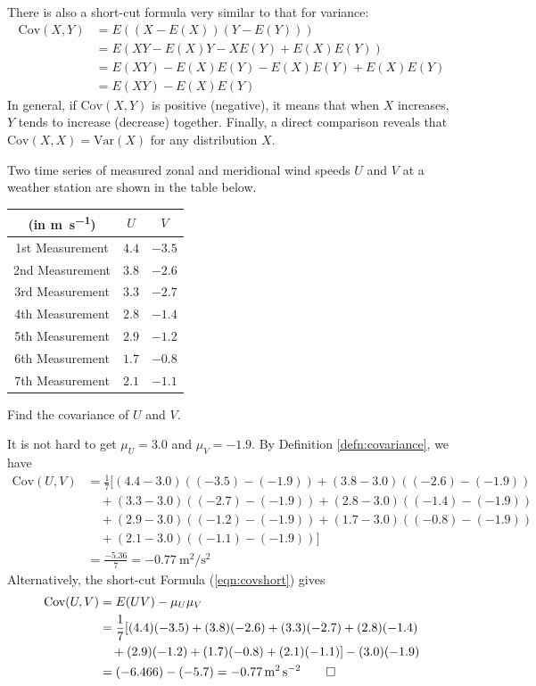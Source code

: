 There is also a short-cut formula very similar to that for variance:
\begin{align}
\text{Cov}(X,Y) &= E((X-E(X))(Y-E(Y))) \nonumber \\
&= E(XY - E(X)Y - XE(Y) + E(X)E(Y)) \nonumber \\
&= E(XY) - E(X)E(Y) - E(X)E(Y) + E(X)E(Y) \nonumber \\
&= E(XY) - E(X)E(Y) \label{eqn:covshort}
\end{align}
In general, if $\text{Cov}(X,Y)$ is positive (negative), it means that when $X$ increases, $Y$ tends to increase (decrease) together. Finally, a direct comparison reveals that $\text{Cov}(X,X) = \text{Var}(X)$ for any distribution $X$. 

\begin{exmp}
Two time series of measured zonal and meridional wind speeds $U$ and $V$ at a weather station are shown in the table below.
\begin{center}
\begin{tabular}{|c|c|c|}
\hline
(in \si{\m \per \s}) & $U$ & $V$\\
\hline
1st Measurement & $4.4$ & $-3.5$ \\
\hline
2nd Measurement & $3.8$ & $-2.6$ \\
\hline
3rd Measurement & $3.3$ & $-2.7$ \\
\hline
4th Measurement & $2.8$ & $-1.4$ \\
\hline
5th Measurement & $2.9$ & $-1.2$ \\
\hline
6th Measurement & $1.7$ & $-0.8$ \\
\hline
7th Measurement & $2.1$ & $-1.1$ \\
\hline
\end{tabular}
\end{center}
Find the covariance of $U$ and $V$.
\end{exmp}
\begin{solution}
It is not hard to get $\mu_U = 3.0$ and $\mu_V = -1.9$. By Definition \ref{defn:covariance}, we have
\begin{align*}
\text{Cov}(U,V) &= \frac{1}{7} [(4.4-3.0)((-3.5)-(-1.9))+(3.8-3.0)((-2.6)-(-1.9)) \\
&\quad+(3.3-3.0)((-2.7)-(-1.9))+(2.8-3.0)((-1.4)-(-1.9)) \\
&\quad+(2.9-3.0)((-1.2)-(-1.9))+(1.7-3.0)((-0.8)-(-1.9)) \\
&\quad+(2.1-3.0)((-1.1)-(-1.9))] \\
&= \frac{-5.36}{7} = \SI{-0.77}{\square\m \per \square\s}
\end{align*}
Alternatively, the short-cut Formula (\ref{eqn:covshort}) gives
\begin{align*}
\text{Cov}(U,V) &= E(UV) - \mu_U \mu_V \\
&= \frac{1}{7}[(4.4)(-3.5) + (3.8)(-2.6) + (3.3)(-2.7) + (2.8)(-1.4) \\
&\quad + (2.9)(-1.2) + (1.7)(-0.8) + (2.1)(-1.1)] - (3.0)(-1.9) \\
&= (-6.466) - (-5.7) = \SI{-0.77}{\square\m \per \square\s} \qedhere
\end{align*}
\end{solution}
